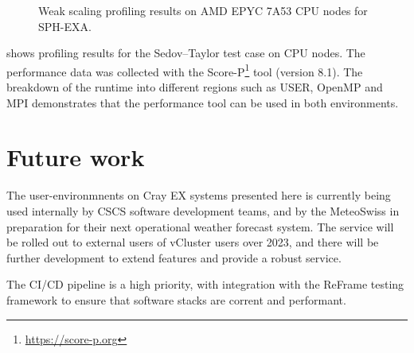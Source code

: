 \begin{figure}[htp!]
    \begin{center}
        
    \end{center}
    \caption{Weak scaling profiling results on AMD EPYC 7A53 CPU nodes for SPH-EXA.}
    \label{fig:sph-weak-scorep}
\end{figure}

 shows profiling results for the Sedov--Taylor test case on CPU nodes.
The performance data was collected with the Score-P\footnote{\url{https://score-p.org}} tool (version 8.1).
The breakdown of the runtime into different regions such as USER, OpenMP and MPI demonstrates that the performance tool can be used in both environments.



\section{Future work}

The user-environmnents on Cray EX systems presented here is currently being used internally by CSCS software development teams, and by the MeteoSwiss in preparation for their next operational weather forecast system.
The service will be rolled out to external users of vCluster users over 2023, and there will be further development to extend features and provide a robust service.


\vfill\eject

The CI/CD pipeline is a high priority, with integration with the ReFrame testing framework to ensure that software stacks are corrent and performant.


